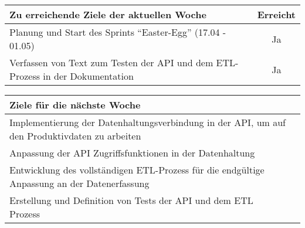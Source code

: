 \begin{tabularx}{\textwidth}{Xc}
    \arrayrulecolor{OliveGreen}
    \toprule
    {\bfseries Zu erreichende Ziele der aktuellen Woche} & {\bfseries Erreicht} \\
    \midrule[2pt]
    Planung und Start des Sprints ``Easter-Egg'' (17.04 - 01.05)  &  Ja  \\
    \rowcolor{OliveGreen!15}
    Verfassen von Text zum Testen der API und dem ETL-Prozess in der
    Dokumentation  &  Ja  \\
    \bottomrule[2pt]
\end{tabularx}
%
\vspace{1cm}
%
\begin{tabularx}{\textwidth}{Xc}
    \arrayrulecolor{OliveGreen}
    \toprule
    {\bfseries Ziele für die nächste Woche}              &                   \\
    \midrule[2pt]
    Implementierung der Datenhaltungsverbindung in der API, um auf den
    Produktivdaten zu arbeiten  &  \\
    \rowcolor{OliveGreen!15}
    Anpassung der API Zugriffsfunktionen in der Datenhaltung  &  \\
    \rowcolor{White}
    Entwicklung des vollständigen ETL-Prozess für die endgültige
    Anpassung an der Datenerfassung  &  \\
    \rowcolor{White}
    Erstellung und Definition von Tests der API und dem ETL Prozess  &  \\
\end{tabularx}
